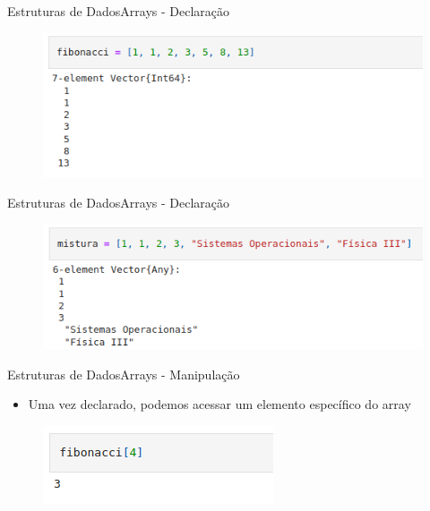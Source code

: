 \documentclass{beamer}
\begin{document}
\begin{frame}{Estruturas de Dados}{Arrays - Declaração}
    \begin{figure}
        \centering
        \includegraphics[scale=0.5]{imagens/array02.png}
        \label{fig:my_label}
    \end{figure}
\end{frame}

\begin{frame}{Estruturas de Dados}{Arrays - Declaração}
    \begin{figure}
        \centering
        \includegraphics[scale=0.5]{imagens/array03.png}
        \label{fig:my_label}
    \end{figure}
\end{frame}

\begin{frame}{Estruturas de Dados}{Arrays - Manipulação}
    \begin{itemize}
        \item Uma vez declarado, podemos acessar um elemento específico do array
    \end{itemize}
    \begin{figure}
        \centering
        \includegraphics[scale=0.5]{imagens/array04.png}
        \label{fig:my_label}
    \end{figure}
\end{frame}
\end{document}
